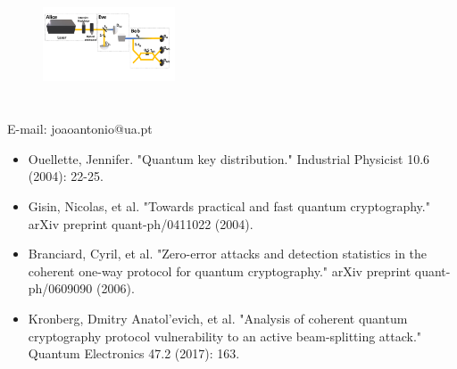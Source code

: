 \documentclass[1000pt]{article}
\newcommand{\mysection}[1]{\section*{\color{black}\sffamily #1}}%
\begin{document}
\begin{figure}[hbt]
    	\centering
    	\includegraphics[width=0.35\textwidth]{./figures/E.pdf}
    \end{figure}

\mysection{} \sffamily \Large
\vspace{-10mm}
\centerline{E-mail: joaoantonio@ua.pt}
\vspace*{7cm}
\begin{itemize}
	\item Ouellette, Jennifer. "Quantum key distribution." Industrial Physicist 10.6 (2004): 22-25.
	\item Gisin, Nicolas, et al. "Towards practical and fast quantum cryptography." arXiv preprint quant-ph/0411022 (2004).
	\item Branciard, Cyril, et al. "Zero-error attacks and detection statistics in the coherent one-way protocol for quantum cryptography." arXiv preprint quant-ph/0609090 (2006).
	\item Kronberg, Dmitry Anatol'evich, et al. "Analysis of coherent quantum cryptography protocol vulnerability to an active beam-splitting attack." Quantum Electronics 47.2 (2017): 163.
\end{itemize}
\end{document}
